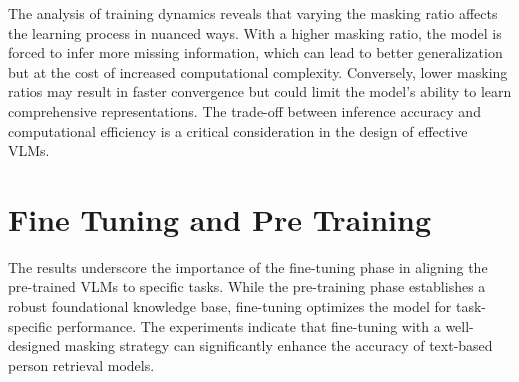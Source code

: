 The analysis of training dynamics reveals that varying the masking ratio affects the learning process in nuanced ways. With a higher masking ratio, the model is forced to infer more missing information, which can lead to better generalization but at the cost of increased computational complexity. Conversely, lower masking ratios may result in faster convergence but could limit the model's ability to learn comprehensive representations. The trade-off between inference accuracy and computational efficiency is a critical consideration in the design of effective VLMs.

\section{Fine Tuning and Pre Training}

The results underscore the importance of the fine-tuning phase in aligning the pre-trained VLMs to specific tasks. While the pre-training phase establishes a robust foundational knowledge base, fine-tuning optimizes the model for task-specific performance. The experiments indicate that fine-tuning with a well-designed masking strategy can significantly enhance the accuracy of text-based person retrieval models.






